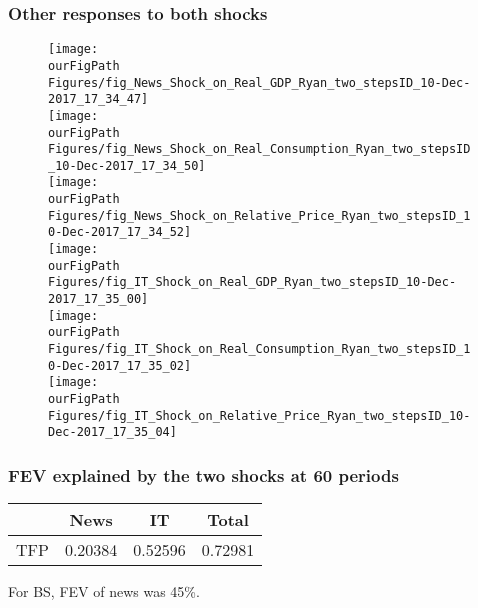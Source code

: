\documentclass{beamer}
\def \ourFigPath {../../}
\begin{document}
\begin{frame}
\frametitle{Other responses to  both shocks}

\vspace{-0.2cm}
\begin{figure}
\begin{multicols}{2}
\centering 
\texttt{[image: \\ourFigPath Figures/fig\_News\_Shock\_on\_Real\_GDP\_Ryan\_two\_stepsID\_10-Dec-2017\_17\_34\_47]}\\ 
\vspace{0.3cm}
\texttt{[image: \\ourFigPath Figures/fig\_News\_Shock\_on\_Real\_Consumption\_Ryan\_two\_stepsID\_10-Dec-2017\_17\_34\_50]}\\ 
\vspace{0.3cm}
\texttt{[image: \\ourFigPath Figures/fig\_News\_Shock\_on\_Relative\_Price\_Ryan\_two\_stepsID\_10-Dec-2017\_17\_34\_52]}\\ 


\texttt{[image: \\ourFigPath Figures/fig\_IT\_Shock\_on\_Real\_GDP\_Ryan\_two\_stepsID\_10-Dec-2017\_17\_35\_00]}\\
\vspace{0.3cm}
\texttt{[image: \\ourFigPath Figures/fig\_IT\_Shock\_on\_Real\_Consumption\_Ryan\_two\_stepsID\_10-Dec-2017\_17\_35\_02]}\\ 
\vspace{0.3cm}
\texttt{[image: \\ourFigPath Figures/fig\_IT\_Shock\_on\_Relative\_Price\_Ryan\_two\_stepsID\_10-Dec-2017\_17\_35\_04]}\\ 

\end{multicols}
\end{figure}


\end{frame}


\begin{frame}
	\frametitle{FEV explained by the two shocks at 60 periods}


    \hspace{2.25cm}
\begin{large}
	\begin{tabular}{lccc}
	\hline
		& News & IT & Total \\
		\hline
	TFP	           & 0.20384  & 0.52596 & 0.72981  \\
		\hline
	\end{tabular}
\end{large}

\vspace{2cm}

For BS, FEV of news was 45\%.
		 	
\end{frame}
\end{document}

